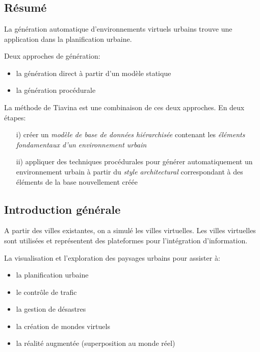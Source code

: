 \documentclass[11pt]{report}
\begin{document}
\chapter*{}

\section*{Résumé}

La génération automatique d’environnements virtuels urbains trouve une application dans la planification urbaine.

Deux approches de génération:
\begin{itemize}
\item la génération direct à partir d’un modèle statique
\item la génération procédurale
\end{itemize}


La méthode de Tiavina est une combinaison de ces deux approches.
En deux étapes:
\begin{itemize}
\item[i)] créer un \textit{modèle de base de données hiérarchisée} contenant les \textit{éléments fondamentaux d’un environnement urbain}
\item[ii)] appliquer des techniques procédurales pour générer automatiquement un environnement urbain à partir du \textit{style architectural} correspondant à des éléments de la base nouvellement créée
\end{itemize}

\section*{Introduction générale}

A partir des villes existantes, on a simulé les villes virtuelles.
Les villes virtuelles sont utilisées et représentent des plateformes pour l'intégration d'information.\newline

La visualisation et l'exploration des paysages urbains pour assister à:
\begin{itemize}
\item la planification urbaine 
\item le contrôle de trafic
\item la gestion de désastres
\item la création de mondes virtuels
\item la réalité augmentée (superposition au monde réel)
\end{itemize}
\end{document}
